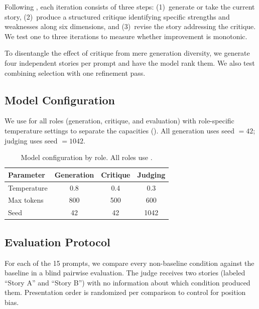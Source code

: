Following \citet{madaan2023selfrefine}, each iteration consists of three steps: (1)~generate or take the current story, (2)~produce a structured critique identifying specific strengths and weaknesses along six dimensions, and (3)~revise the story addressing the critique.
We test one to three iterations to measure whether improvement is monotonic.

To disentangle the effect of critique from mere generation diversity, we generate four independent stories per prompt and have the model rank them.
We also test combining selection with one refinement pass.

\subsection{Model Configuration}
\label{sec:config}

We use \gptfour for all roles (generation, critique, and evaluation) with role-specific temperature settings to separate the capacities ().
All generation uses seed $= 42$; judging uses seed $= 1042$.

\begin{table}[t]
\centering
\caption{Model configuration by role. All roles use \gptfour.}
\label{tab:config}
\begin{tabular}{@{}lccc@{}}
\toprule
\textbf{Parameter} & \textbf{Generation} & \textbf{Critique} & \textbf{Judging} \\
\midrule
Temperature & 0.8 & 0.4 & 0.3 \\
Max tokens & 800 & 500 & 600 \\
Seed & 42 & 42 & 1042 \\
\bottomrule
\end{tabular}
\end{table}

\subsection{Evaluation Protocol}
\label{sec:evaluation}

For each of the 15 prompts, we compare every non-baseline condition against the baseline in a blind pairwise evaluation.
The judge receives two stories (labeled ``Story A'' and ``Story B'') with no information about which condition produced them.
Presentation order is randomized per comparison to control for position bias.

